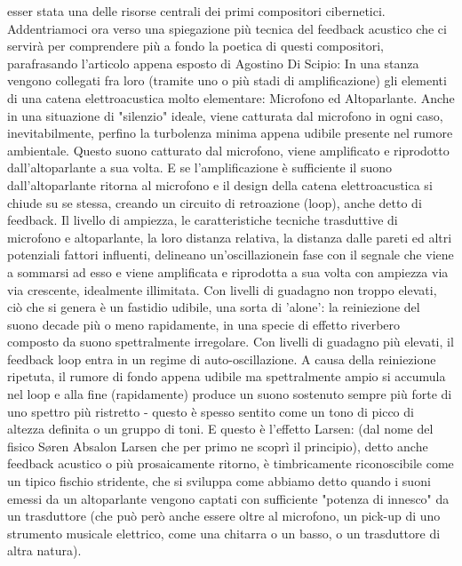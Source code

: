 esser stata una delle risorse centrali dei primi compositori cibernetici.
Addentriamoci ora verso una spiegazione più tecnica del feedback acustico
che ci servirà per comprendere più
a fondo la poetica di questi compositori,
parafrasando l'articolo appena esposto di Agostino Di Scipio:
In una stanza vengono collegati fra loro (tramite uno o più stadi di amplificazione) gli
elementi di una catena elettroacustica molto elementare: Microfono ed Altoparlante. Anche in
una situazione di "silenzio" ideale, viene catturata dal microfono in ogni caso,
inevitabilmente, perfino la turbolenza minima appena udibile presente nel rumore ambientale.
Questo suono catturato dal microfono, viene amplificato e riprodotto dall’altoparlante a sua
volta. E se l'amplificazione è sufficiente il suono dall’altoparlante ritorna al microfono e
il design della catena elettroacustica si chiude su se stessa,
creando un circuito di
retroazione (loop), anche detto di feedback.
Il livello di ampiezza, le caratteristiche
tecniche trasduttive di microfono e altoparlante, la loro distanza relativa, la distanza dalle
pareti ed altri potenziali fattori influenti, delineano un’oscillazionein fase con il segnale
che viene a sommarsi ad esso e viene amplificata e riprodotta a sua volta con ampiezza via via
crescente, idealmente illimitata. Con livelli di guadagno non troppo elevati, ciò che si
genera è un fastidio udibile, una sorta di 'alone':
la reiniezione del suono decade più o meno
rapidamente, in una specie di effetto riverbero composto da suono spettralmente irregolare.
Con livelli di guadagno più elevati, il feedback loop entra in un regime di auto-oscillazione.
A causa della reiniezione ripetuta, il rumore di fondo appena udibile ma spettralmente ampio
si accumula nel loop e alla fine (rapidamente) produce un suono sostenuto sempre più forte di
uno spettro più ristretto - questo è spesso sentito come un tono di picco di altezza definita
o un gruppo di toni. E questo è l'effetto Larsen: (dal nome del fisico Søren Absalon Larsen
che per primo ne scoprì il principio), detto anche feedback acustico o più prosaicamente
ritorno, è timbricamente riconoscibile come un tipico fischio stridente, che si sviluppa come
abbiamo detto quando i suoni emessi da un altoparlante vengono captati con sufficiente
"potenza di innesco" da un trasduttore (che può però anche essere oltre al microfono, un
pick-up di uno strumento musicale elettrico, come una chitarra o un basso, o un trasduttore di
altra natura).